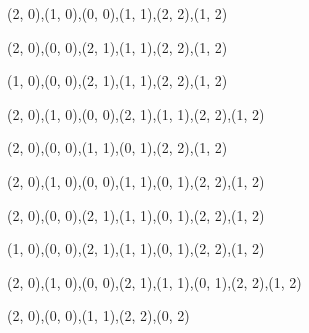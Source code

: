 \begin{figure}
  \begin{subfigure}[b]{0.14\textwidth}
    \resizebox{\linewidth}{!} {
       {{(2, 0),(1, 0),(0, 0),(1, 1),(2, 2),(1, 2)}} {{}}
    }
  \end{subfigure}
  \begin{subfigure}[b]{0.14\textwidth}
    \resizebox{\linewidth}{!} {
       {{(2, 0),(0, 0),(2, 1),(1, 1),(2, 2),(1, 2)}} {{}}
    }
  \end{subfigure}
  \begin{subfigure}[b]{0.14\textwidth}
    \resizebox{\linewidth}{!} {
       {{(1, 0),(0, 0),(2, 1),(1, 1),(2, 2),(1, 2)}} {{}}
    }
  \end{subfigure}
  \begin{subfigure}[b]{0.14\textwidth}
    \resizebox{\linewidth}{!} {
       {{(2, 0),(1, 0),(0, 0),(2, 1),(1, 1),(2, 2),(1, 2)}} {{}}
    }
  \end{subfigure}
  \begin{subfigure}[b]{0.14\textwidth}
    \resizebox{\linewidth}{!} {
       {{(2, 0),(0, 0),(1, 1),(0, 1),(2, 2),(1, 2)}} {{}}
    }
  \end{subfigure}
  \begin{subfigure}[b]{0.14\textwidth}
    \resizebox{\linewidth}{!} {
       {{(2, 0),(1, 0),(0, 0),(1, 1),(0, 1),(2, 2),(1, 2)}} {{}}
    }
  \end{subfigure}
  \begin{subfigure}[b]{0.14\textwidth}
    \resizebox{\linewidth}{!} {
       {{(2, 0),(0, 0),(2, 1),(1, 1),(0, 1),(2, 2),(1, 2)}} {{}}
    }
  \end{subfigure}
  \begin{subfigure}[b]{0.14\textwidth}
    \resizebox{\linewidth}{!} {
       {{(1, 0),(0, 0),(2, 1),(1, 1),(0, 1),(2, 2),(1, 2)}} {{}}
    }
  \end{subfigure}
  \begin{subfigure}[b]{0.14\textwidth}
    \resizebox{\linewidth}{!} {
       {{(2, 0),(1, 0),(0, 0),(2, 1),(1, 1),(0, 1),(2, 2),(1, 2)}} {{}}
    }
  \end{subfigure}
  \begin{subfigure}[b]{0.14\textwidth}
    \resizebox{\linewidth}{!} {
       {{(2, 0),(0, 0),(1, 1),(2, 2),(0, 2)}} {{}}
    }
  \end{subfigure}
  \begin{subfigure}[b]{0.14\textwidth}

\end{subfigure}
\end{figure}
